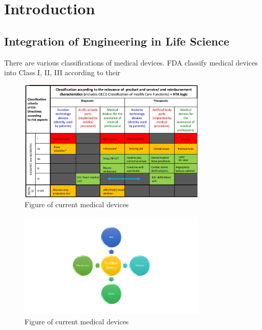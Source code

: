 \chapter{Introduction}
\section{Integration of Engineering in Life Science}
There are various classifications of medical devices. FDA classify medical devices into Class I, II, III according to their

\begin{figure}[t]
		\centering
		\includegraphics[width=0.8\textwidth]{figs/devices.png}
		\caption{\small Figure of current medical devices}
		\label{fig:Cur}
\end{figure}

\begin{figure}[t]
		\centering
		\includegraphics[width=0.8\textwidth]{figs/stakeholders.pdf}
		\caption{\small Figure of current medical devices}
		\label{fig:Cur}
\end{figure}
